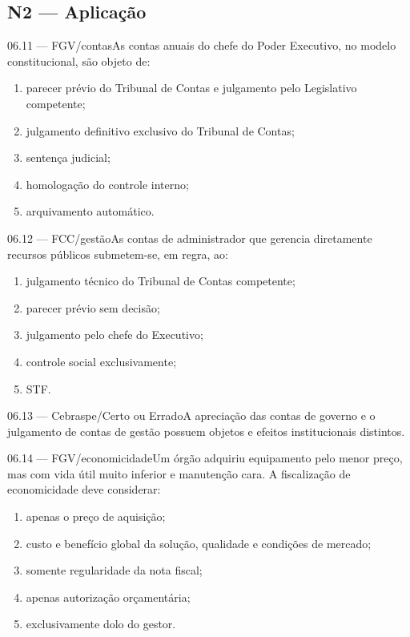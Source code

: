 \subsection*{N2 — Aplicação}
\begin{questao}{ 06.11 — FGV/contas}As contas anuais do chefe do Poder Executivo, no modelo constitucional, são objeto de:\begin{enumerate}[label=\Alph*)]\item parecer prévio do Tribunal de Contas e julgamento pelo Legislativo competente;\item julgamento definitivo exclusivo do Tribunal de Contas;\item sentença judicial;\item homologação do controle interno;\item arquivamento automático.\end{enumerate}\end{questao}
\begin{questao}{ 06.12 — FCC/gestão}As contas de administrador que gerencia diretamente recursos públicos submetem-se, em regra, ao:\begin{enumerate}[label=\Alph*)]\item julgamento técnico do Tribunal de Contas competente;\item parecer prévio sem decisão;\item julgamento pelo chefe do Executivo;\item controle social exclusivamente;\item STF.\end{enumerate}\end{questao}
\begin{questao}{ 06.13 — Cebraspe/Certo ou Errado}A apreciação das contas de governo e o julgamento de contas de gestão possuem objetos e efeitos institucionais distintos.\end{questao}
\begin{questao}{ 06.14 — FGV/economicidade}Um órgão adquiriu equipamento pelo menor preço, mas com vida útil muito inferior e manutenção cara. A fiscalização de economicidade deve considerar:\begin{enumerate}[label=\Alph*)]\item apenas o preço de aquisição;\item custo e benefício global da solução, qualidade e condições de mercado;\item somente regularidade da nota fiscal;\item apenas autorização orçamentária;\item exclusivamente dolo do gestor.\end{enumerate}\end{questao}
